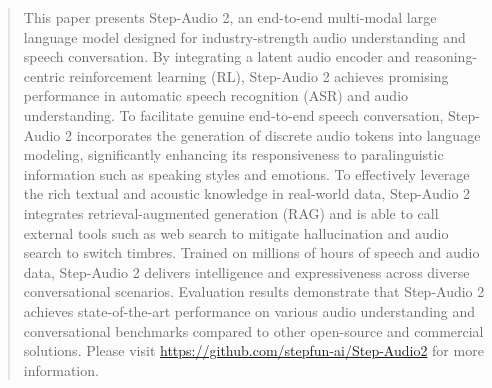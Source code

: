 \begin{abstract}
This paper presents Step-Audio 2, an end-to-end multi-modal large language model designed for industry-strength audio understanding and speech conversation. By integrating a latent audio encoder and reasoning-centric reinforcement learning (RL), Step-Audio 2 achieves promising performance in automatic speech recognition (ASR) and audio understanding. To facilitate genuine end-to-end speech conversation, Step-Audio 2 incorporates the generation of discrete audio tokens into language modeling, significantly enhancing its responsiveness to paralinguistic information such as speaking styles and emotions. To effectively leverage the rich textual and acoustic knowledge in real-world data, Step-Audio 2 integrates retrieval-augmented generation (RAG) and is able to call external tools such as web search to mitigate hallucination and audio search to switch timbres. Trained on millions of hours of speech and audio data, Step-Audio 2 delivers intelligence and expressiveness across diverse conversational scenarios. Evaluation results demonstrate that Step-Audio 2 achieves state-of-the-art performance on various audio understanding and conversational benchmarks compared to other open-source and commercial solutions. Please visit \url{https://github.com/stepfun-ai/Step-Audio2} for more information.

\end{abstract}
